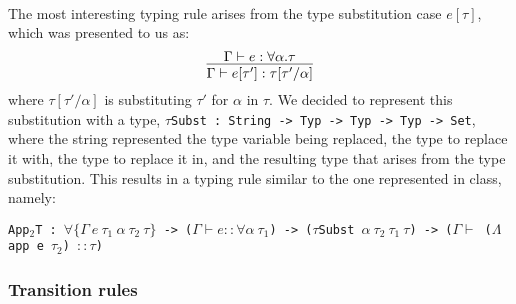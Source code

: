 \documentclass[12pt]{article}
\begin{document}
\paragraph{} The most interesting typing rule arises from the type substitution case $e[\tau]$, which was presented to us as:
$$\infer{\Gamma \vdash e[\tau'] : \tau[\tau' / \alpha]} {\Gamma \vdash e : \forall \alpha . \tau }$$
where $\tau[\tau'/ \alpha]$ is substituting $\tau'$ for $\alpha$ in $\tau$. We decided to represent this substitution with a type, \texttt{$\tau$Subst : String -> Typ -> Typ -> Typ -> Set}, where the string represented the type variable being replaced, the type to replace it with, the type to replace it in, and the resulting type that arises from the type substitution. This results in a typing rule similar to the one represented in class, namely:
\begin{center}
\texttt{App$_2$T : $\forall \{ \Gamma \ e \ \tau_1 \ \alpha \ \tau_2 \ \tau \}$ -> ($\Gamma \vdash e :: \forall \alpha \ \tau_1$) -> \newline ($\tau$Subst $\alpha \ \tau_2 \ \tau_1 \ \tau$) -> ($\Gamma \vdash$ ($\Lambda$app e $\tau_2$) $:: \tau$)}
\end{center}

\subsubsection{Transition rules}
\end{document}
